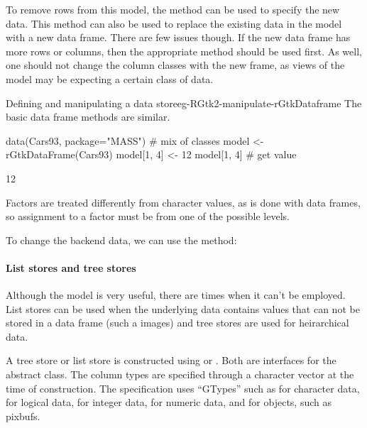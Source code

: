 To remove rows from this model, the 
method can be used to specify the new data. This method can also be used
to replace the existing data in the model with a new data
frame. There are few issues though. If the new data frame has more
rows or columns, then the appropriate  method should be
used first. As well, one should not change the column classes with the
new frame, as views of the model may be expecting a certain class of data.

\begin{example}{Defining and manipulating a data store}{eg-RGtk2-manipulate-rGtkDataframe}
  The basic data frame methods are similar.
\begin{Schunk}
\begin{Sinput}
 data(Cars93, package="MASS")            # mix of classes
 model <- rGtkDataFrame(Cars93)
 model[1, 4] <- 12
 model[1, 4]                              # get value
\end{Sinput}
\begin{Soutput}
[1] 12
\end{Soutput}
\end{Schunk}
Factors are treated differently from character values, as is done with
data frames, so assignment to a factor must be from one of the
possible levels.

To change the backend data, we can use the  method:
\begin{Schunk}
\end{Schunk}
\end{example}


\paragraph{List stores and tree stores}
Although the  model is very useful, there are
times when it can't be employed. List stores can be used when the
underlying data contains values that can not be stored in a data frame
(such a images) and tree stores are used for heirarchical data. 

A tree store or list store is constructed using
 or  . Both are
interfaces for the abstract  class. The
column types are specified through a character vector at the time of
construction. The specification uses ``GTypes'' such as
 for character data,  for logical data,
 for integer data,  for numeric data, and
 for \GTK\/ objects, such as pixbufs.


